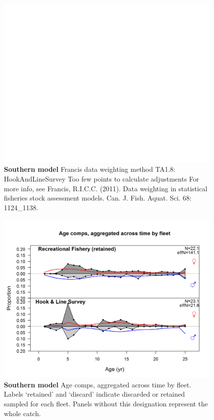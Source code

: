 \documentclass[12pt,]{article}
\begin{document}
\begin{figure}[htbp]
\centering
\includegraphics{./r4ss/plots_mod2/comp_agefit_data_weighting_TA1.8_HookAndLineSurvey.png}
\caption{\textbf{Southern model} Francis data weighting method TA1.8:
HookAndLineSurvey Too few points to calculate adjustments For more info,
see Francis, R.I.C.C. (2011). Data weighting in statistical fisheries
stock assessment models. Can. J. Fish. Aquat. Sci. 68: 1124\_1138.
\label{fig:mod2_8_comp_agefit_data_weighting_TA1.8_HookAndLineSurvey}}
\end{figure}

\begin{figure}[htbp]
\centering
\includegraphics{./r4ss/plots_mod2/comp_agefit__aggregated_across_time.png}
\caption{\textbf{Southern model} Age comps, aggregated across time by
fleet. Labels `retained' and `discard' indicate discarded or retained
sampled for each fleet. Panels without this designation represent the
whole catch. \label{fig:mod2_9_comp_agefit__aggregated_across_time}}
\end{figure}
\end{document}
